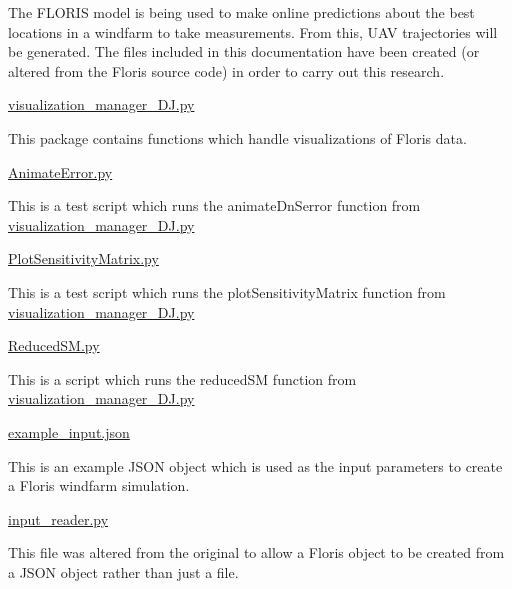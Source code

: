 The F\+L\+O\+R\+IS model is being used to make online predictions about the best locations in a windfarm to take measurements. From this, U\+AV trajectories will be generated. The files included in this documentation have been created (or altered from the Floris source code) in order to carry out this research.

\mbox{\hyperlink{visualization__manager___d_j_8py}{visualization\+\_\+manager\+\_\+\+D\+J.\+py}}

This package contains functions which handle visualizations of Floris data.

\mbox{\hyperlink{_animate_error_8py}{Animate\+Error.\+py}}

This is a test script which runs the animate\+Dn\+Serror function from \mbox{\hyperlink{visualization__manager___d_j_8py}{visualization\+\_\+manager\+\_\+\+D\+J.\+py}}

\mbox{\hyperlink{_plot_sensitivity_matrix_8py}{Plot\+Sensitivity\+Matrix.\+py}}

This is a test script which runs the plot\+Sensitivity\+Matrix function from \mbox{\hyperlink{visualization__manager___d_j_8py}{visualization\+\_\+manager\+\_\+\+D\+J.\+py}}

\mbox{\hyperlink{_reduced_s_m_8py}{Reduced\+S\+M.\+py}}

This is a script which runs the reduced\+SM function from \mbox{\hyperlink{visualization__manager___d_j_8py}{visualization\+\_\+manager\+\_\+\+D\+J.\+py}}

\mbox{\hyperlink{example__input_8json}{example\+\_\+input.\+json}}

This is an example J\+S\+ON object which is used as the input parameters to create a Floris windfarm simulation.

\mbox{\hyperlink{input__reader_8py}{input\+\_\+reader.\+py}}

This file was altered from the original to allow a Floris object to be created from a J\+S\+ON object rather than just a file. 